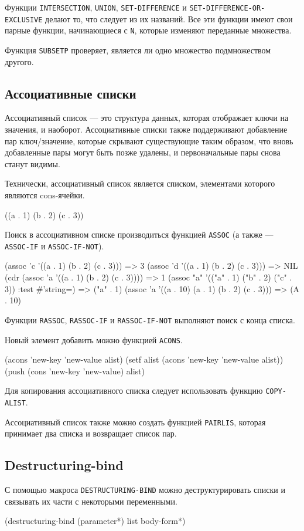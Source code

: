 Функции \lstinline{INTERSECTION}, \lstinline{UNION}, \lstinline{SET-DIFFERENCE} и \lstinline{SET-DIFFERENCE-OR-EXCLUSIVE} делают то, что следует из их названий. Все эти функции имеют свои парные функции, начинающиеся с \lstinline{N}, которые изменяют переданные множества.

Функция \lstinline{SUBSETP} проверяет, является ли одно множество подмножеством другого.

\subsection{Ассоциативные списки}
Ассоциативный список — это структура данных, которая отображает ключи на значения, и наоборот. Ассоциативные списки также поддерживают добавление пар ключ/значение, которые скрывают существующие таким образом, что вновь добавленные пары могут быть позже удалены, и первоначальные пары снова станут видимы.

Технически, ассоциативный список является списком, элементами которого являются cons-ячейки.
\begin{cllst}{}{}
((a . 1) (b . 2) (c . 3))
\end{cllst}

Поиск в ассоциативном списке производиться функцией \lstinline{ASSOC} (а также — \lstinline{ASSOC-IF} и \lstinline{ASSOC-IF-NOT}).
\begin{cllst}{}{}
(assoc 'c '((a . 1) (b . 2) (c . 3))) => 3
(assoc 'd '((a . 1) (b . 2) (c . 3))) => NIL
(cdr (assoc 'a '((a . 1) (b . 2) (c . 3)))) => 1
(assoc "a" '(("a" . 1) ("b" . 2) ("c" . 3)) :test #'string=) => ("a" . 1)
(assoc 'a '((a . 10) (a . 1) (b . 2) (c . 3))) => (A . 10)
\end{cllst}

Функции \lstinline{RASSOC}, \lstinline{RASSOC-IF} и \lstinline{RASSOC-IF-NOT} выполняют поиск с конца списка.

Новый элемент добавить можно функцией \lstinline{ACONS}.
\begin{cllst}{}{}
(acons 'new-key 'new-value alist)
(setf alist (acons 'new-key 'new-value alist))
(push (cons 'new-key 'new-value) alist)
\end{cllst}

Для копирования ассоциативного списка следует использовать функцию \lstinline{COPY-ALIST}.

Ассоциативный список также можно создать функцией \lstinline{PAIRLIS}, которая принимает два списка и возвращает список пар.

\subsection{Destructuring-bind}
С помощью макроса \lstinline{DESTRUCTURING-BIND} можно деструктурировать списки и связывать их части с некоторыми переменными.
\begin{cllst}{}{}
(destructuring-bind (parameter*) list
  body-form*)
\end{cllst}

